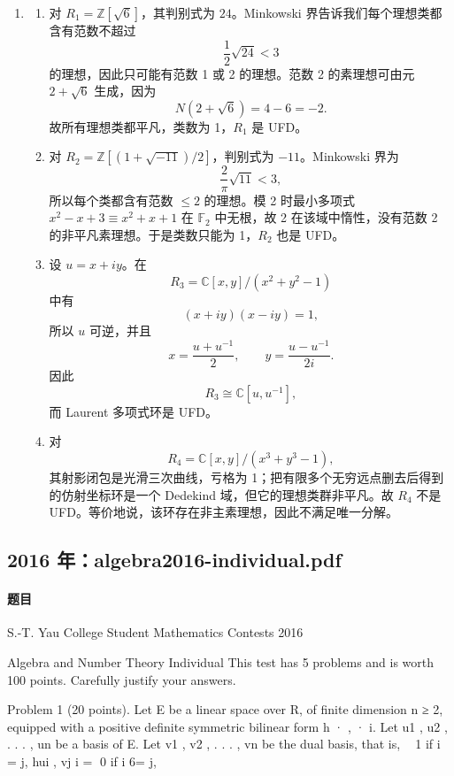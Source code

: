 \documentclass[UTF8,12pt]{ctexart}
\begin{document}
\begin{enumerate}[label=\textbf{\arabic*.},leftmargin=2.2em]
\item
\begin{enumerate}[label=\textbf{(\alph*)},leftmargin=2.4em]
\item 对 \(R_1=\mathbb Z[\sqrt6]\)，其判别式为 \(24\)。Minkowski 界告诉我们每个理想类都含有范数不超过
\[
\frac12\sqrt{24}<3
\]
的理想，因此只可能有范数 1 或 2 的理想。范数 2 的素理想可由元 \(2+\sqrt6\) 生成，因为
\[
N(2+\sqrt6)=4-6=-2.
\]
故所有理想类都平凡，类数为 1，\(R_1\) 是 UFD。

\item 对 \(R_2=\mathbb Z[(1+\sqrt{-11})/2]\)，判别式为 \(-11\)。Minkowski 界为
\[
\frac{2}{\pi}\sqrt{11}<3,
\]
所以每个类都含有范数 \(\le2\) 的理想。模 2 时最小多项式 \(x^2-x+3\equiv x^2+x+1\) 在 \(\mathbb F_2\) 中无根，故 2 在该域中惰性，没有范数 2 的非平凡素理想。于是类数只能为 1，\(R_2\) 也是 UFD。

\item 设 \(u=x+iy\)。在
\[
R_3=\mathbb C[x,y]/(x^2+y^2-1)
\]
中有
\[
(x+iy)(x-iy)=1,
\]
所以 \(u\) 可逆，并且
\[
 x=\frac{u+u^{-1}}2,\qquad y=\frac{u-u^{-1}}{2i}.
\]
因此
\[
R_3\cong \mathbb C[u,u^{-1}],
\]
而 Laurent 多项式环是 UFD。

\item 对
\[
R_4=\mathbb C[x,y]/(x^3+y^3-1),
\]
其射影闭包是光滑三次曲线，亏格为 1；把有限多个无穷远点删去后得到的仿射坐标环是一个 Dedekind 域，但它的理想类群非平凡。故 \(R_4\) 不是 UFD。等价地说，该环存在非主素理想，因此不满足唯一分解。
\end{enumerate}
\end{enumerate}

\subsection{2016 年：algebra2016-individual.pdf}
\paragraph{题目}
S.-T. Yau College Student Mathematics Contests 2016

Algebra and Number Theory Individual This test has 5 problems and is worth 100 points. Carefully justify your answers.

Problem 1 (20 points). Let E be a linear space over R, of finite dimension n ≥ 2, equipped with a positive definite symmetric bilinear form h · , · i. Let u1 , u2 , . . . , un be a basis of E. Let v1 , v2 , . . . , vn be the dual basis, that is,  1 if i = j, hui , vj i = 0 if i 6= j,
\end{document}
